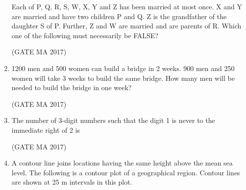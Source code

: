 \documentclass[journal,12pt,onecolumn]{IEEEtran}
\theoremstyle{remark}
\begin{document}
\begin{enumerate}
Each of P, Q, R, S, W, X, Y and Z has been married at most once. X and Y are married and have two children P and Q. Z is the grandfather of the daughter S of P. Further, Z and W are married and are parents of R. Which one of the following must necessarily be FALSE?
\begin{enumerate}
\end{enumerate}
\hfill (GATE MA 2017)
\item
1200 men and 500 women can build a bridge in 2 weeks. 900 men and 250 women will take 3 weeks to build the same bridge. How many men will be needed to build the bridge in one week?
\begin{enumerate}
\end{enumerate}
\hfill (GATE MA 2017)
\item
The number of 3-digit numbers such that the digit 1 is never to the immediate right of 2 is
\begin{enumerate}
\end{enumerate}
\hfill (GATE MA 2017)
\item
A contour line joins locations having the same height above the mean sea level. The following is a contour plot of a geographical region. Contour lines are shown at 25 m intervals in this plot.


\end{enumerate}
\end{document}
